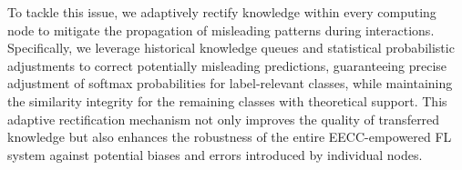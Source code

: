 \documentclass[10pt,journal]{IEEEtran}
\let\oldsum\sum
\renewcommand{\sum}{\displaystyle\oldsum}
\begin{document}
To tackle this issue, we adaptively rectify knowledge within every computing node to mitigate the propagation of misleading patterns during interactions. Specifically, we leverage historical knowledge queues and statistical probabilistic adjustments to correct potentially misleading predictions, guaranteeing precise adjustment of softmax probabilities for label-relevant classes, while maintaining the similarity integrity for the remaining classes with theoretical support. This adaptive rectification mechanism not only improves the quality of transferred knowledge but also enhances the robustness of the entire EECC-empowered FL system against potential biases and errors introduced by individual nodes.



\end{document}
